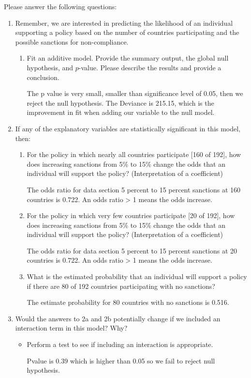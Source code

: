 \documentclass[12pt,letterpaper]{article}
\begin{document}
\newpage
\noindent Please answer the following questions:

\begin{enumerate}
	\item
	Remember, we are interested in predicting the likelihood of an individual supporting a policy based on the number of countries participating and the possible sanctions for non-compliance.
	\begin{enumerate}
		\item [] Fit an additive model. Provide the summary output, the global null hypothesis, and $p$-value. Please describe the results and provide a conclusion.
 
\noindent  The p value is very small, smaller than significance level of 0.05, then we reject the null hypothesis. The Deviance is 215.15, which is the improvement in fit when adding our variable to the null model.
	\end{enumerate}
	
	\item
	If any of the explanatory variables are statistically significant in this model, then:
	\begin{enumerate}
		\item
		For the policy in which nearly all countries participate [160 of 192], how does increasing sanctions from 5\% to 15\% change the odds that an individual will support the policy? (Interpretation of a coefficient)
		 
		\noindent  The odds ratio for data section 5 percent to 15 percent sanctions at 160 countries is 0.722. An odds ratio > 1 means the odds increase.
		\item
		For the policy in which very few countries participate [20 of 192], how does increasing sanctions from 5\% to 15\% change the odds that an individual will support the policy? (Interpretation of a coefficient)
		 
		\noindent  The odds ratio for data section 5 percent to 15 percent sanctions at 20 countries is 0.722. An odds ratio > 1 means the odds increase.
		\item
		What is the estimated probability that an individual will support a policy if there are 80 of 192 countries participating with no sanctions? 
		 
		\noindent  The estimate probability for 80 countries with no sanctions is 0.516.
	\end{enumerate}
	\item
	Would the answers to 2a and 2b potentially change if we included an interaction term in this model? Why? 
	\begin{itemize}
		\item Perform a test to see if including an interaction is appropriate.
		 
		\noindent  Pvalue is 0.39 which is higher than 0.05 so we fail to reject null hypothesis.
	\end{itemize}
	\end{enumerate}
\end{document}
